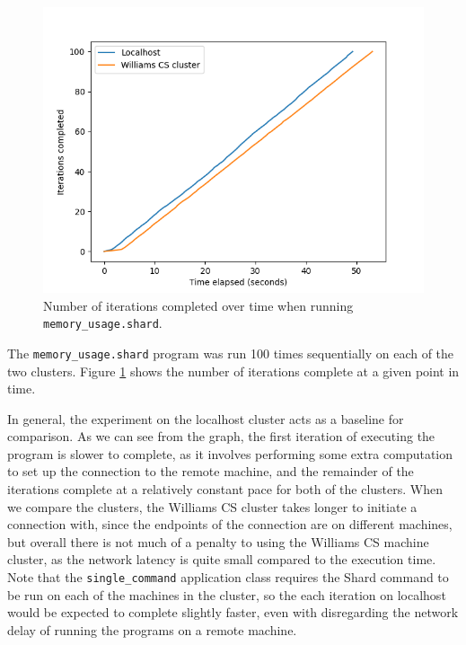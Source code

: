 \documentclass[twoside]{report}
\begin{document}
\begin{figure}[h]
  \begin{center}
    \includegraphics[scale=0.9]{img/experiments/e1_1620966966721.png}
    \caption{Number of iterations completed over time when running \texttt{memory\_usage.shard}.}
    \label{fig:memoryusage}
  \end{center}
\end{figure}

The \texttt{memory\_usage.shard} program was run 100 times sequentially on each of the two clusters.
Figure \ref{fig:memoryusage} shows the number of iterations complete at a given point in time.

In general, the experiment on the localhost cluster acts as a baseline for comparison.
As we can see from the graph, the first iteration of executing the program is slower to complete, as it involves performing some extra computation to set up the connection to the remote machine, and the remainder of the iterations complete at a relatively constant pace for both of the clusters.
When we compare the clusters, the Williams CS cluster takes longer to initiate a connection with, since the endpoints of the connection are on different machines, but overall there is not much of a penalty to using the Williams CS machine cluster, as the network latency is quite small compared to the execution time.
Note that the \texttt{single\_command} application class requires the Shard command to be run on each of the machines in the cluster, so the each iteration on localhost would be expected to complete slightly faster, even with disregarding the network delay of running the programs on a remote machine.
\end{document}
